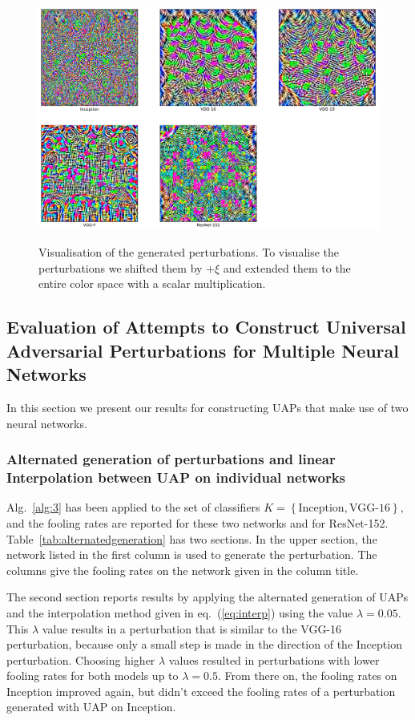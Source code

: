 \documentclass[runningheads]{llncs}
\begin{document}
\begin{figure}[h]\label{fig:UAPs}
	\centering
		\includegraphics[width=1.00\textwidth]{images/own_perturbations.png}
	\label{fig_stoerwerte}
	\caption{Visualisation of the generated perturbations. To visualise the perturbations we shifted them by $+\xi$ and extended them to the entire color space with a scalar multiplication.}
\end{figure}


\subsection{Evaluation of Attempts to Construct Universal Adversarial Perturbations for Multiple Neural Networks}
In this section we present our results for constructing UAPs that make use of two neural networks.
\subsubsection{Alternated generation of perturbations and linear Interpolation between UAP on individual networks}
Alg.~\ref{alg:3} has been applied to the set of classifiers $K=\left\{\text{Inception},\text{VGG-16}\right\}$, and the fooling rates are reported for these two networks and for ResNet-152. Table~\ref{tab:alternatedgeneration} has two sections. In the upper section, the network listed in the first column is used to generate the perturbation. The columns give the fooling rates on the network given in the column title.

The second section reports results by applying the alternated generation of UAPs and the interpolation method given in eq.~(\ref{eq:interp}) using the value $\lambda=0.05$. This $\lambda$ value results in a perturbation that is similar to the VGG-16 perturbation, because only a small step is made in the direction of the Inception perturbation. Choosing higher $\lambda$ values resulted in perturbations with lower fooling rates for both models up to $\lambda=0.5$. From there on, the fooling rates on Inception improved again, but didn't exceed the fooling rates of a perturbation generated with UAP on Inception.
\end{document}
